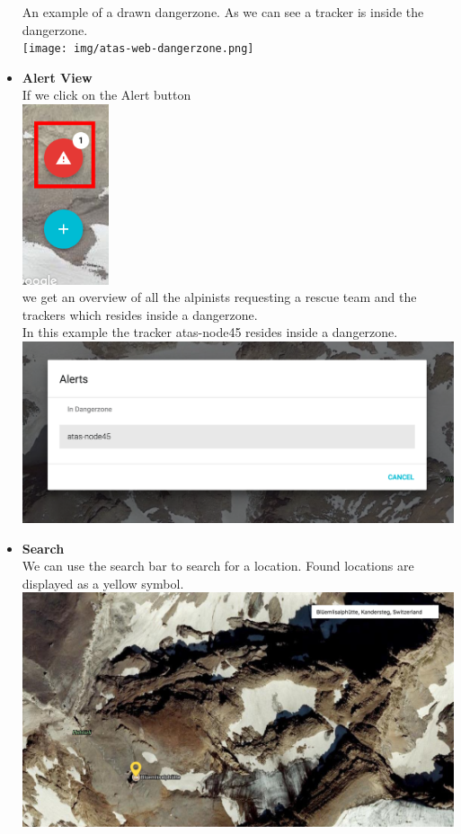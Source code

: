 \documentclass[a4paper,11pt, oneside]{report}
\theoremstyle{definition}
\begin{document}
\begin{itemize}
An example of a drawn dangerzone. As we can see a tracker is inside the dangerzone.\\[0.3cm]
\texttt{[image: img/atas-web-dangerzone.png]}

\item \textbf{Alert View}\\ If we click on the Alert button\\[0.3cm]
\includegraphics[width=0.2\textwidth]{img/atas-web-alertbutton.png}\\[0.3cm]
we get an overview of all the alpinists requesting a rescue team and the trackers which resides inside a dangerzone.\\[0.3cm]
In this example the tracker atas-node45 resides inside a dangerzone.\\[0.3cm]
\includegraphics[width=\textwidth]{img/atas-web-alertoverview.png}\\

\newpage
\item \textbf{Search}\\
We can use the search bar to search for a location. Found locations are displayed as a yellow symbol.\\[0.3cm]
\includegraphics[width=\textwidth]{img/atas-web-search.png}\\

\end{itemize}
\end{document}
